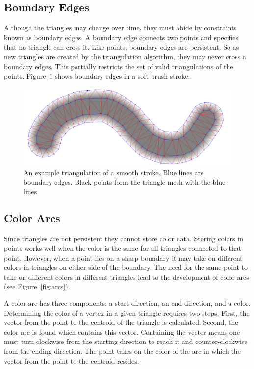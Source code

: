 \documentclass[review]{acmsiggraph}
\begin{document}
\subsection{Boundary Edges}
Although the triangles may change over time, they must abide by constraints known as
boundary edges. A boundary edge connects two points and specifies that no triangle
can cross it. Like points, boundary edges are persistent. So as new triangles are created by the triangulation algorithm, they
may never cross a boundary edges.  This partially restricts the set of valid triangulations of the points.  Figure~\ref{fig:stroke} shows boundary edges in a soft brush stroke.


\begin{figure}
    \centering
        \includegraphics[width=\columnwidth]{images/stroke}
    \caption{An example triangulation of a smooth stroke. Blue lines are boundary edges. Black points form the triangle
    mesh with the blue lines.}
    \label{fig:stroke}
\end{figure}

\subsection{Color Arcs}
Since triangles are not persistent they cannot store color data.
Storing colors in points works well when the color is the same for all triangles connected
to that point. However, when a point lies on a sharp boundary it may take on different colors in
triangles on either side of the boundary. The need for the same point to take on different
colors in different triangles lead to the development of color arcs (see Figure~\ref{fig:arcs}).

A color arc has three components: a start direction, an end direction, and a color. 
Determining the color of a vertex in a given triangle requires two steps. First,
the vector from the point to the centroid of the triangle is calculated. Second,
the color arc is found which contains this vector. Containing the vector means one must turn
clockwise from the starting direction to reach it and counter-clockwise from the ending direction.
The point takes on the color of the arc in which the vector from the point to the centroid resides.
\end{document}

